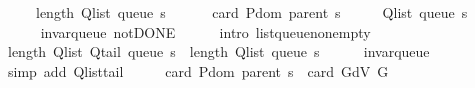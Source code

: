 \begin{isabellebody}
\ \ \ \ \ length\ {\isacharparenleft}{\kern0pt}Q{\isacharunderscore}{\kern0pt}list\ {\isacharparenleft}{\kern0pt}queue\ s{\isacharparenright}{\kern0pt}{\isacharparenright}{\kern0pt}\ {\isacharminus}{\kern0pt}\isanewline
\ \ \ \ \ card\ {\isacharparenleft}{\kern0pt}P{\isachardot}{\kern0pt}dom\ {\isacharparenleft}{\kern0pt}parent\ s{\isacharparenright}{\kern0pt}{\isacharparenright}{\kern0pt}{\isachardoublequoteclose}%
\endisataginvisible
{\isafoldinvisible}%
%
\isadeliminvisible
\isanewline
%
\endisadeliminvisible
%
\isadelimproof
%
\endisadelimproof
%
\isatagproof
{}\isamarkupfalse%
\ {\isacharminus}{\kern0pt}\isanewline
\ \ \isamarkupfalse%
\ {\isachardoublequoteopen}Q{\isacharunderscore}{\kern0pt}list\ {\isacharparenleft}{\kern0pt}queue\ s{\isacharparenright}{\kern0pt}\ {\isasymnoteq}\ {\isacharbrackleft}{\kern0pt}{\isacharbrackright}{\kern0pt}{\isachardoublequoteclose}\isanewline
\ \ \ \ \isamarkupfalse%
\ invar{\isacharunderscore}{\kern0pt}queue\ not{\isacharunderscore}{\kern0pt}DONE\isanewline
\ \ \ \ \isamarkupfalse%
\ {\isacharparenleft}{\kern0pt}intro\ list{\isacharunderscore}{\kern0pt}queue{\isacharunderscore}{\kern0pt}non{\isacharunderscore}{\kern0pt}empty{\isacharparenright}{\kern0pt}\isanewline
\ \ \isamarkupfalse%
\ {\isachardoublequoteopen}length\ {\isacharparenleft}{\kern0pt}Q{\isacharunderscore}{\kern0pt}list\ {\isacharparenleft}{\kern0pt}Q{\isacharunderscore}{\kern0pt}tail\ {\isacharparenleft}{\kern0pt}queue\ s{\isacharparenright}{\kern0pt}{\isacharparenright}{\kern0pt}{\isacharparenright}{\kern0pt}\ {\isacharless}{\kern0pt}\ length\ {\isacharparenleft}{\kern0pt}Q{\isacharunderscore}{\kern0pt}list\ {\isacharparenleft}{\kern0pt}queue\ s{\isacharparenright}{\kern0pt}{\isacharparenright}{\kern0pt}{\isachardoublequoteclose}\isanewline
\ \ \ \ \isamarkupfalse%
\ invar{\isacharunderscore}{\kern0pt}queue\isanewline
\ \ \ \ \isamarkupfalse%
\ {\isacharparenleft}{\kern0pt}simp\ add{\isacharcolon}{\kern0pt}\ Q{\isachardot}{\kern0pt}list{\isacharunderscore}{\kern0pt}tail{\isacharparenright}{\kern0pt}\isanewline
\ \ \isamarkupfalse%
\ \isamarkupfalse%
\ {\isachardoublequoteopen}card\ {\isacharparenleft}{\kern0pt}P{\isachardot}{\kern0pt}dom\ {\isacharparenleft}{\kern0pt}parent\ s{\isacharparenright}{\kern0pt}{\isacharparenright}{\kern0pt}\ {\isasymle}\ card\ {\isacharparenleft}{\kern0pt}G{\isachardot}{\kern0pt}dV\ G{\isacharparenright}{\kern0pt}{\isachardoublequoteclose}\isanewline
\ \ \ \ \isamarkupfalse%

\end{isabellebody}
